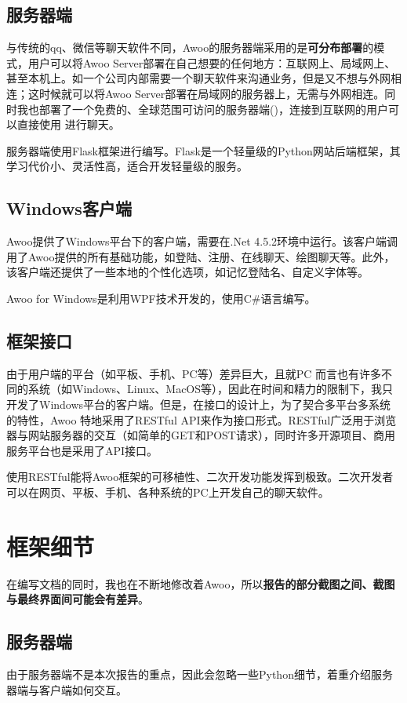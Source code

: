 \documentclass[a4paper,11pt]{article}
\begin{document}
    \subsection{服务器端}
        与传统的qq、微信等聊天软件不同，Awoo的服务器端采用的是\textbf{可分布部署}的模式，用户可以将Awoo Server部署在自己想要的任何地方：互联网上、局域网上、甚至本机上。如一个公司内部需要一个聊天软件来沟通业务，但是又不想与外网相连；这时候就可以将Awoo Server部署在局域网的服务器上，无需与外网相连。同时我也部署了一个免费的、全球范围可访问的服务器端(\cite{1})，连接到互联网的用户可以直接使用\cite{1} 进行聊天。\par
        服务器端使用Flask\textsuperscript{\cite{3}}框架进行编写。Flask是一个轻量级的Python网站后端框架，其学习代价小、灵活性高，适合开发轻量级的服务。
    \subsection{Windows客户端}
        Awoo提供了Windows平台下的客户端，需要在.Net 4.5.2环境中运行。该客户端调用了Awoo提供的所有基础功能，如登陆、注册、在线聊天、绘图聊天等。此外，该客户端还提供了一些本地的个性化选项，如记忆登陆名、自定义字体等。\par
        Awoo for Windows是利用WPF技术开发的，使用C\#语言编写。
    \subsection{框架接口}
        由于用户端的平台（如平板、手机、PC等）差异巨大，且就PC 而言也有许多不同的系统（如Windows、Linux、MacOS等），因此在时间和精力的限制下，我只开发了Windows平台的客户端。但是，在接口的设计上，为了契合多平台多系统的特性，Awoo 特地采用了RESTful API来作为接口形式。RESTful广泛用于浏览器与网站服务器的交互（如简单的GET和POST请求），同时许多开源项目、商用服务平台也是采用了API接口。\par
        使用RESTful能将Awoo框架的可移植性、二次开发功能发挥到极致。二次开发者可以在网页、平板、手机、各种系统的PC上开发自己的聊天软件。

\section{框架细节}
    在编写文档的同时，我也在不断地修改着Awoo，所以\textbf{报告的部分截图之间、截图与最终界面间可能会有差异}。
    \subsection{服务器端}
        由于服务器端不是本次报告的重点，因此会忽略一些Python细节，着重介绍服务器端与客户端如何交互。
\end{document}
